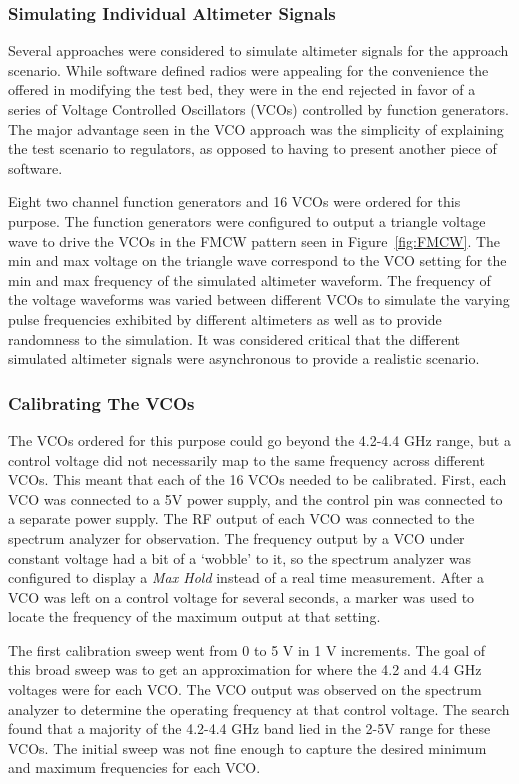 \subsubsection{Simulating Individual Altimeter Signals}
Several approaches were considered to simulate altimeter signals for the approach scenario. While software defined radios were appealing for the convenience the offered in modifying the test bed, they were in the end rejected in favor of a series of Voltage Controlled Oscillators (VCOs) controlled by function generators. The major advantage seen in the VCO approach was the simplicity of explaining the test scenario to regulators, as opposed to having to present another piece of software.

Eight two channel function generators and 16 VCOs were ordered for this purpose. The function generators were configured to output a triangle voltage wave to drive the VCOs in the FMCW pattern seen in Figure~\ref{fig:FMCW}. The min and max voltage on the triangle wave correspond to the VCO setting for the min and max frequency of the simulated altimeter waveform. The frequency of the voltage waveforms was varied between different VCOs to simulate the varying pulse frequencies exhibited by different altimeters as well as to provide randomness to the simulation. It was considered critical that the different simulated altimeter signals were asynchronous to provide a realistic scenario. 


\subsubsection{Calibrating The VCOs}
The VCOs ordered for this purpose could go beyond the 4.2-4.4 GHz range, but a control voltage did not necessarily map to the same frequency across different VCOs. This meant that each of the 16 VCOs needed to be calibrated. First, each VCO was connected to a 5V power supply, and the control pin was connected to a separate power supply. The RF output of each VCO was connected to the spectrum analyzer for observation. The frequency output by a VCO under constant voltage had a bit of a `wobble' to it, so the spectrum analyzer was configured to display a \textit{Max Hold} instead of a real time measurement. After a VCO was left on a control voltage for several seconds, a marker was used to locate the frequency of the maximum output at that setting. 

The first calibration sweep went from 0 to 5 V in 1 V increments.  The goal of this broad sweep was to get an approximation for where the 4.2 and 4.4 GHz voltages were for each VCO. The VCO output was observed on the spectrum analyzer to determine the operating frequency at that control voltage. The search found that a majority of the 4.2-4.4 GHz band lied in the 2-5V range for these VCOs. The initial sweep was not fine enough to capture the desired minimum and maximum frequencies for each VCO. 


